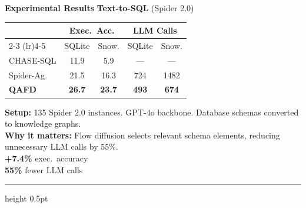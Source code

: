 \documentclass[final]{beamer}
\newlength{\colC}\setlength{\colC}{0.26\paperwidth}   %
\begin{document}
\begin{frame}[t]
\begin{columns}[t]
\begin{column}{\colC}
\begin{block}{\Large\textbf{\color{samsungblue} Experimental Results}}
\textbf{\large\color{samsungblue} Text-to-SQL} {\small(Spider 2.0)}\par\vspace{0.3em}
\begin{table}
\vspace{-0.8em}
\scriptsize
\begin{tabular}{l cc cc}
  \toprule
  & \multicolumn{2}{c}{\textbf{Exec.\ Acc.}} & \multicolumn{2}{c}{\textbf{LLM Calls}} \\
  \cmidrule(lr){2-3} \cmidrule(lr){4-5}
  & SQLite & Snow. & SQLite & Snow. \\
  \midrule
  CHASE-SQL     & 11.9 & 5.9  & --- & --- \\
  Spider-Ag.    & 21.5 & 16.3 & 724 & 1482 \\
  \midrule
  \textbf{QAFD} & \textbf{26.7} & \textbf{23.7} & \textbf{493} & \textbf{674} \\
  \bottomrule
\end{tabular}
\vspace{-0.8em}
\end{table}
\noindent\scriptsize
\textbf{Setup:} 135 Spider 2.0 instances. GPT-4o backbone. Database schemas converted to knowledge graphs.\\[3pt]
\textbf{Why it matters:} Flow diffusion selects relevant schema elements, reducing unnecessary LLM calls by 55\%.\\[3pt]
\colorbox{accentgreen!15}{\textcolor{accentgreen}{\textbf{+7.4\%}} exec.\ accuracy}\\[2pt]
\colorbox{accentgreen!15}{\textcolor{accentgreen}{\textbf{55\%}} fewer LLM calls}\par
\vspace{0.5em}
{\color{samsungblue!30}\hrule height 0.5pt}
\vspace{0.5em}


\end{block}
\end{column}
\end{columns}
\end{frame}
\end{document}
